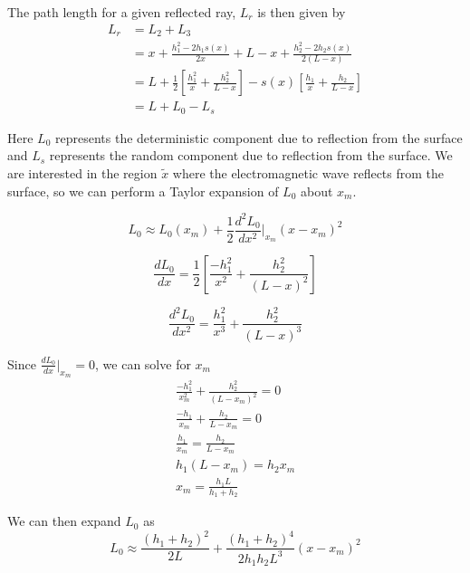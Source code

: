 The path length for a given reflected ray, $L_r$ is then given by
\begin{equation}
\begin{aligned}
L_r &= L_2 + L_3 \\
& = x + \frac{h_1^2-2h_1s(x)}{2x} +  L-x + \frac{h_2^2 - 2h_2s(x)}{2\left(L-x\right)} \\
& = L + \frac{1}{2}\left[\frac{h_1^2}{x} + \frac{h_2^2}{L-x} \right] - s(x)\left[ \frac{h_1}{x} + \frac{h_2}{L-x}\right] \\
&= L + L_0 - L_s
\end{aligned}
\label{mp_eq:13}
\end{equation}
\renewcommand{\baselinestretch}{2} \small\normalsize

Here $L_0$ represents the deterministic component due to reflection from the surface and $L_s$ represents the random component due to reflection from the surface. We are interested in the region $\tilde{x}$ where the electromagnetic wave reflects from the surface, so we can perform a Taylor expansion of $L_0$ about $x_m$.

\begin{equation}
L_0 \approx L_0(x_m) + \frac{1}{2}\frac{d^2L_0}{dx^2}\bigg|_{x_m}(x-x_m)^2
\label{mp_eq:14}
\end{equation}

\begin{equation}
\frac{dL_0}{dx} = \frac{1}{2}\left[\frac{-h_1^2}{x^2} + \frac{h_2^2}{(L-x)^2} \right]
\label{mp_eq:15}
\end{equation}

\begin{equation}
\frac{d^2L_0}{dx^2} = \frac{h_1^2}{x^3} + \frac{h_2^2}{(L-x)^3} 
\label{mp_eq:16}
\end{equation}

Since $\frac{dL_0}{dx}\big|_{x_m} = 0$, we can solve for $x_m$
\begin{equation}
\begin{gathered}
\frac{-h_1^2}{x_m^2} + \frac{h_2^2}{(L-x_m)^2} = 0\\
\frac{-h_1}{x_m} + \frac{h_2}{L-x_m} = 0\\
\frac{h_1}{x_m} = \frac{h_2}{L-x_m}\\
h_1(L-x_m) = h_2x_m\\
x_m = \frac{h_1L}{h_1+h_2}
\end{gathered}
\label{mp_eq:17}
\end{equation}

We can then expand $L_0$ as
\begin{equation}
L_0 \approx \frac{(h_1+h_2)^2}{2L} + \frac{(h_1+h_2)^4}{2h_1h_2L^3}(x-x_m)^2
\label{mp_eq:18}
\end{equation}

